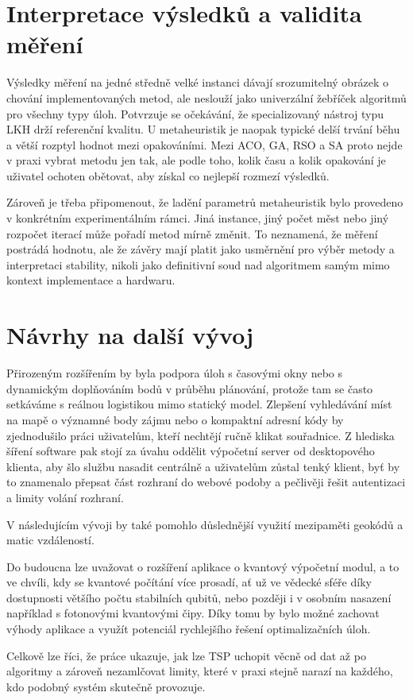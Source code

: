 \section{Interpretace výsledků a validita měření}

Výsledky měření na jedné středně velké instanci dávají srozumitelný obrázek o chování implementovaných metod, ale neslouží jako univerzální žebříček algoritmů pro všechny typy úloh. Potvrzuje se očekávání, že specializovaný nástroj typu LKH drží referenční kvalitu. U metaheuristik je naopak typické delší trvání běhu a větší rozptyl hodnot mezi opakováními. Mezi ACO, GA, RSO a SA proto nejde v praxi vybrat metodu jen tak, ale podle toho, kolik času a kolik opakování je uživatel ochoten obětovat, aby získal co nejlepší rozmezí výsledků.

Zároveň je třeba připomenout, že ladění parametrů metaheuristik bylo provedeno v konkrétním experimentálním rámci. Jiná instance, jiný počet měst nebo jiný rozpočet iterací může pořadí metod mírně změnit. To neznamená, že měření postrádá hodnotu, ale že závěry mají platit jako usměrnění pro výběr metody a interpretaci stability, nikoli jako definitivní soud nad algoritmem samým mimo kontext implementace a hardwaru.

\section{Návrhy na další vývoj}

Přirozeným rozšířením by byla podpora úloh s časovými okny nebo s dynamickým doplňováním bodů v průběhu plánování, protože tam se často setkáváme s reálnou logistikou mimo statický model. Zlepšení vyhledávání míst na mapě o významné body zájmu nebo o kompaktní adresní kódy by zjednodušilo práci uživatelům, kteří nechtějí ručně klikat souřadnice. Z hlediska šíření software pak stojí za úvahu oddělit výpočetní server od desktopového klienta, aby šlo službu nasadit centrálně a uživatelům zůstal tenký klient, byť by to znamenalo přepsat část rozhraní do webové podoby a pečlivěji řešit autentizaci a limity volání rozhraní.

V následujícím vývoji by také pomohlo důslednější využití mezipaměti geokódů a matic vzdáleností. 

Do budoucna lze uvažovat o rozšíření aplikace o kvantový výpočetní modul, a to ve chvíli, kdy se kvantové počítání více prosadí, ať už ve vědecké sféře díky dostupnosti většího počtu stabilních qubitů, nebo později i v osobním nasazení například s fotonovými kvantovými čipy. Díky tomu by bylo možné zachovat výhody aplikace a využít potenciál rychlejšího řešení optimalizačních úloh.

Celkově lze říci, že práce ukazuje, jak lze TSP uchopit věcně od dat až po algoritmy a zároveň nezamlčovat limity, které v praxi stejně narazí na každého, kdo podobný systém skutečně provozuje.
